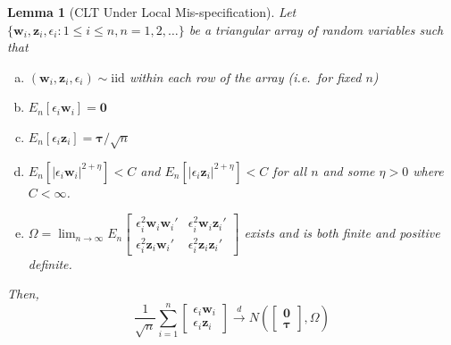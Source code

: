 \documentclass[12pt]{article}\usepackage[]{graphicx}\usepackage[]{color}
\newtheorem{lem}{Lemma}[section]
\theoremstyle{definition}
\begin{document}
\begin{lem}[CLT Under Local Mis-specification] 
\label{lem:CLT}
 Let $\{\mathbf{w}_i, \mathbf{z}_i, \epsilon_i\colon 1 \leq i \leq n, n = 1, 2, \hdots\}$ be a triangular array of random variables such that 
  \begin{enumerate}[(a)]
    \item $(\mathbf{w}_i, \mathbf{z}_i, \epsilon_i) \sim \mbox {iid}$ within each row of the array (i.e.\ for fixed $n$)
    \item $E_n\left[\epsilon_i \mathbf{w}_i \right] = \mathbf{0}$
    \item $E_n\left[\epsilon_i \mathbf{z}_i \right] = \boldsymbol{\tau}/\sqrt{n}$
    \item $E_n \left[\left|\epsilon_i \mathbf{w}_i\right|^{2+\eta} \right] < C$ and $E_n \left[\left|\epsilon_i \mathbf{z}_i\right|^{2+\eta} \right] < C$ for all $n$ and some $\eta > 0$ where $C < \infty$.
    \item $\displaystyle  \Omega = \lim_{n \rightarrow \infty} E_n \left[\begin{array}{cc}
    \epsilon_i^2 \mathbf{w}_i \mathbf{w}_i' &  \epsilon_i^2 \mathbf{w}_i\mathbf{z}_i '\\
    \epsilon_i^2 \mathbf{z}_i \mathbf{w}_i'& \epsilon_i^2 \mathbf{z}_i \mathbf{z}_i'
    \end{array}\right]$ exists and is both finite and positive definite.
  \end{enumerate}
  Then, 
    $$\frac{1}{\sqrt{n}} \sum_{i=1}^n \left[\begin{array}{c} \epsilon_i \mathbf{w}_i \\ \epsilon_i \mathbf{z}_i \end{array} \right] \overset{d}{\rightarrow} N\left(\left[\begin{array}{c} \mathbf{0} \\ \boldsymbol{\tau} \end{array} \right], \Omega\right)$$
\end{lem}
\end{document}
